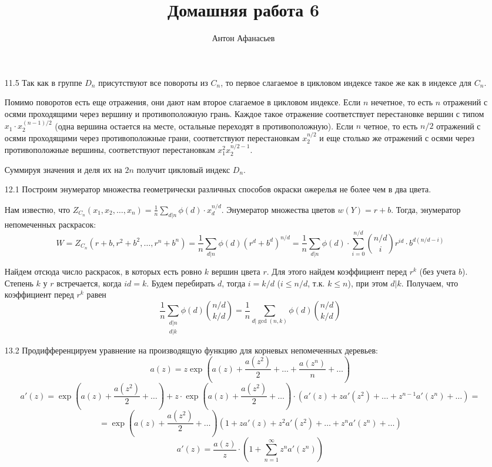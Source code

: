 \documentclass[10pt]{article}
\begin{document}
\title{Домашняя работа 6}
\author{Антон Афанасьев}
\maketitle

\begin{enumerate}
\item[11.5] Так как в группе $D_n$ присутствуют все повороты из $C_n$, то первое слагаемое в цикловом индексе такое же как в индексе для $C_n$. 

Помимо поворотов есть еще отражения, они дают нам второе слагаемое в цикловом индексе. Если $n$ нечетное, то есть $n$ отражений с осями проходящими через вершину и противоположную грань. Каждое такое отражение соответствует перестановке вершин с типом $x_1 \cdot x_2 ^{(n-1)/2}$ (одна вершина остается на месте, остальные переходят в противоположную). Если $n$ четное, то есть $n/2$ отражений с осями проходящими через противоположные грани, соответствуют перестановкам $x_2^{n/2}$ и еще столько же отражений с осями через противоположные вершины, соответствуют перестановкам $x_1^2 x_2^{n/2-1}$.

Суммируя значения и деля их на $2n$ получит цикловый индекс $D_n$.

\item[12.1] Построим энумератор множества геометрически различных способов окраски ожерелья не более чем в два цвета.

	Нам известно, что $Z_{C_n}(x_1, x_2, \ldots, x_n) = \frac{1}{n} \sum_{d|n} \phi(d) \cdot x_d^{n/d}$. Энумератор множества цветов $w(Y) = r + b$. Тогда, энумератор непомеченных раскрасок:
	$$W = Z_{C_n}(r+b, r^2+b^2, \ldots, r^n+b^n) = \frac{1}{n} \sum_{d|n}\phi(d) (r^d + b^d)^{n/d} = \frac{1}{n} \sum_{d|n} \phi(d) \cdot \sum_{i=0}^{n/d} \binom{n/d}{i} r^{id} \cdot b^{d(n/d-i)}$$
	
	Найдем отсюда число раскрасок, в которых есть ровно $k$ вершин цвета $r$. Для этого найдем коэффициент перед $r^k$ (без учета $b$). Степень $k$ у $r$ встречается, когда $id = k$. Будем перебирать $d$, тогда $i = k/d$ ($i \le n/d$, т.к. $k\le n$), при этом $d | k$. Получаем, что коэффициент перед $r^k$ равен
	$$\frac{1}{n} \sum_{\substack{d | n\\d|k}} \phi(d) \binom{n/d}{k/d} = \frac{1}{n} \sum_{d | \gcd(n, k)} \phi(d) \binom{n/d}{k/d}$$
	
\item[13.2] Продифференцируем уравнение на производящую функцию для корневых непомеченных деревьев:
$$a(z) = z \exp \left (a(z) + \frac{a(z^2)}{2} + \ldots + \frac{a(z^n)}{n} + \ldots \right)$$
$$a'(z) =  \exp \left (a(z) + \frac{a(z^2)}{2} + \ldots \right) + z \cdot \exp \left (a(z) + \frac{a(z^2)}{2} + \ldots \right) \cdot \left (a'(z) + za'(z^2) + \ldots + z^{n-1} a'(z^n) + \ldots \right) = $$
$$ = \exp \left (a(z) + \frac{a(z^2)}{2} + \ldots \right) \left (1 + z a'(z) + z^2 a'(z^2) + \ldots + z^{n} a'(z^n) + \ldots \right)$$
$$a'(z) = \frac{a(z)}{z} \cdot \left ( 1 + \sum_{n=1}^\infty z^n a'(z^n) \right)$$


\end{enumerate}
\end{document}

